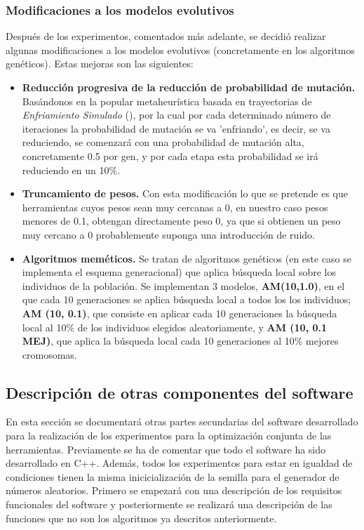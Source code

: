 	\subsubsection{Modificaciones a los modelos evolutivos}
	Después de los experimentos, comentados más adelante, se decidió realizar algunas modificaciones a los modelos evolutivos (concretamente en los algoritmos genéticos). Estas mejoras son las siguientes:
	\begin{itemize}
		\item \textbf{Reducción progresiva de la reducción de probabilidad de mutación.} Basándonos en la popular metaheurística basada en trayectorias de \textit{Enfriamiento Simulado} (\cite{enfriamiento}), por la cual por cada determinado número de iteraciones la probabilidad de mutación se va 'enfriando', es decir, se va reduciendo, se comenzará con una probabilidad de mutación alta, concretamente 0.5 por gen, y por cada etapa esta probabilidad se irá reduciendo en un 10\%.
		\item \textbf{Truncamiento de pesos.} Con esta modificación lo que se pretende es que herramientas cuyos pesos sean muy cercanas a 0, en nuestro caso pesos menores de 0.1, obtengan directamente peso 0, ya que si obtienen un peso muy cercano a 0 probablemente suponga una introducción de ruido.
		\item \textbf{Algoritmos meméticos.} Se tratan de algoritmos genéticos (en este caso se implementa el esquema generacional) que aplica búsqueda local sobre los individuos de la población. Se implementan 3 modelos, \textbf{AM(10,1.0)}, en el que cada 10 generaciones se aplica búsqueda local a todos los los individuos; \textbf{AM (10, 0.1)}, que consiste en aplicar cada 10 generaciones la búsqueda local al 10\% de los individuos elegidos aleatoriamente, y \textbf{AM (10, 0.1 MEJ)}, que aplica la búsqueda local cada 10 generaciones al 10\% mejores cromosomas.
	\end{itemize}

\subsection{Descripción de otras componentes del software} \label{is}
En esta sección se documentará otras partes secundarias del software desarrollado para la realización de los experimentos para la optimización conjunta de las herramientas. Previamente se ha de comentar que todo el software ha sido desarrollado en C++. Además, todos los experimentos para estar en igualdad de condiciones tienen la misma inicicialización de la semilla para el generador de números aleatorios. Primero se empezará con una descripción de los requisitos funcionales del software y posteriormente se realizará una descripción de las funciones que no son los algoritmos ya descritos anteriormente.

